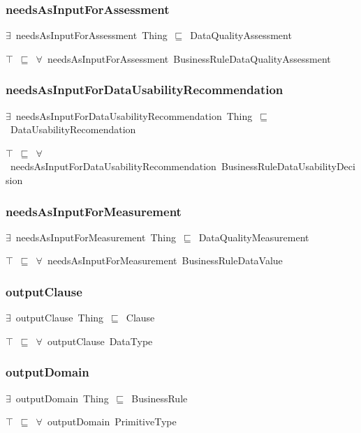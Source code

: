 \documentclass{article}
\begin{document}
\subsubsection*{needsAsInputForAssessment}

\ensuremath{\exists}~needsAsInputForAssessment~Thing~\ensuremath{\sqsubseteq}~DataQualityAssessment

\ensuremath{\top}~\ensuremath{\sqsubseteq}~\ensuremath{\forall}~needsAsInputForAssessment~BusinessRuleDataQualityAssessment

\subsubsection*{needsAsInputForDataUsabilityRecommendation}

\ensuremath{\exists}~needsAsInputForDataUsabilityRecommendation~Thing~\ensuremath{\sqsubseteq}~DataUsabilityRecomendation

\ensuremath{\top}~\ensuremath{\sqsubseteq}~\ensuremath{\forall}~needsAsInputForDataUsabilityRecommendation~BusinessRuleDataUsabilityDecision

\subsubsection*{needsAsInputForMeasurement}

\ensuremath{\exists}~needsAsInputForMeasurement~Thing~\ensuremath{\sqsubseteq}~DataQualityMeasurement

\ensuremath{\top}~\ensuremath{\sqsubseteq}~\ensuremath{\forall}~needsAsInputForMeasurement~BusinessRuleDataValue

\subsubsection*{outputClause}

\ensuremath{\exists}~outputClause~Thing~\ensuremath{\sqsubseteq}~Clause

\ensuremath{\top}~\ensuremath{\sqsubseteq}~\ensuremath{\forall}~outputClause~DataType

\subsubsection*{outputDomain}

\ensuremath{\exists}~outputDomain~Thing~\ensuremath{\sqsubseteq}~BusinessRule

\ensuremath{\top}~\ensuremath{\sqsubseteq}~\ensuremath{\forall}~outputDomain~PrimitiveType
\end{document}
